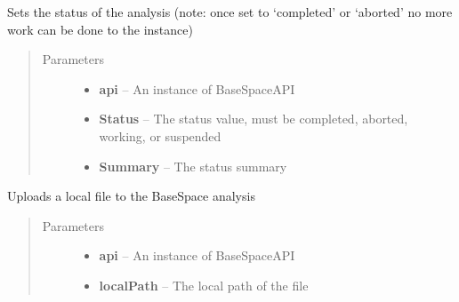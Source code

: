 \documentclass[letterpaper,10pt,english]{sphinxmanual}
\begin{document}
\begin{fulllineitems}
\begin{fulllineitems}
\begin{description}
\end{description}

\end{fulllineitems}


\begin{fulllineitems}
\label{Available modules:BaseSpacePy.model.Analysis.Analysis.setStatus}
Sets the status of the analysis (note: once set to `completed' or `aborted' no more work can be done to the instance)
\begin{quote}\begin{description}
\item[{Parameters}] \leavevmode\begin{itemize}
\item {} 
\textbf{api} -- An instance of BaseSpaceAPI

\item {} 
\textbf{Status} -- The status value, must be completed, aborted, working, or suspended

\item {} 
\textbf{Summary} -- The status summary

\end{itemize}

\end{description}\end{quote}

\end{fulllineitems}


\begin{fulllineitems}
\label{Available modules:BaseSpacePy.model.Analysis.Analysis.uploadFile}
Uploads a local file to the BaseSpace analysis
\begin{quote}\begin{description}
\item[{Parameters}] \leavevmode\begin{itemize}
\item {} 
\textbf{api} -- An instance of BaseSpaceAPI

\item {} 
\textbf{localPath} -- The local path of the file


\end{itemize}
\end{description}
\end{quote}
\end{fulllineitems}
\end{fulllineitems}
\end{document}

